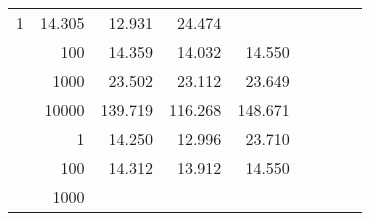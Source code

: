 \begin{table}
\begin{tabular}{rrrrrrrrr}
					\multirow{ 1 }{*}{ 1 } &
					
						
							    
							    
	                           14.305 & 12.931 & 24.474  \\
	                
	            
					 &  
					 
					\multirow{ 1 }{*}{ 100 } &
					
						
							    
							    
	                           14.359 & 14.032 & 14.550  \\
	                
	            
					 &  
					 
					\multirow{ 1 }{*}{ 1000 } &
					
						
							    
							    
	                           23.502 & 23.112 & 23.649  \\
	                
	            
					 &  
					 
					\multirow{ 1 }{*}{ 10000 } &
					
						
							    
							    
	                           139.719 & 116.268 & 148.671  \\
	                
	            
	        
				\noalign{\smallskip}\hline
				\multirow{ 4 }{*}{ 160000 } &
				
					
					 
					\multirow{ 1 }{*}{ 1 } &
					
						
							    
							    
	                           14.250 & 12.996 & 23.710  \\
	                
	            
					 &  
					 
					\multirow{ 1 }{*}{ 100 } &
					
						
							    
							    
	                           14.312 & 13.912 & 14.550  \\
	                
	            
					 &  
					 
					\multirow{ 1 }{*}{ 1000 } &
					

\end{tabular}
\end{table}
